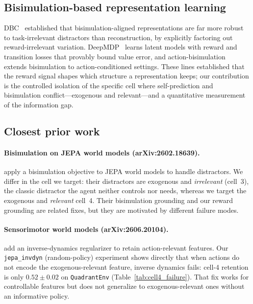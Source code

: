 \documentclass[11pt]{article}
\begin{document}
\subsection{Bisimulation-based representation learning}
DBC~\citep{zhang2020dbc} established that bisimulation-aligned representations are far more robust to
task-irrelevant distractors than reconstruction, by explicitly factoring out reward-irrelevant
variation. DeepMDP~\citep{gelada2019deepmdp} learns latent models with reward and transition losses
that provably bound value error, and action-bisimulation~\citep{actionbisim2024} extends
bisimulation to action-conditioned settings. These lines established that the reward signal shapes
which structure a representation keeps; our contribution is the controlled isolation of the specific
cell where self-prediction and bisimulation conflict---exogenous and relevant---and a quantitative
measurement of the information gap.

\subsection{Closest prior work}
\paragraph{Bisimulation on JEPA world models (arXiv:2602.18639).}
\citet{bisimjepa2026} apply a bisimulation objective to JEPA world models to handle distractors. We
differ in the cell we target: their distractors are exogenous
and \emph{irrelevant} (cell~3), the classic distractor the agent neither controls nor needs, whereas
we target the exogenous and \emph{relevant} cell~4. Their bisimulation grounding and our reward
grounding are related fixes, but they are motivated by different failure modes.

\paragraph{Sensorimotor world models (arXiv:2606.20104).}
\citet{sensorimotor2026} add an inverse-dynamics regularizer to retain action-relevant features.
Our \texttt{jepa\_invdyn} (random-policy) experiment shows directly that
when actions do not encode the exogenous-relevant feature, inverse dynamics fails: cell-4 retention
is only $0.52\pm0.02$ on \texttt{QuadrantEnv} (Table~\ref{tab:cell4_failure}). That fix works for
controllable features but does not generalize to exogenous-relevant ones without an informative
policy.
\end{document}
